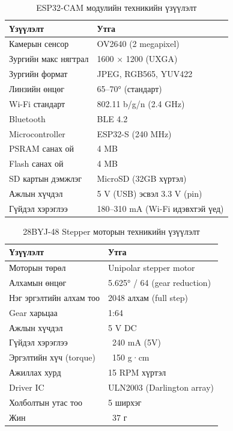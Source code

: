 \documentclass[12pt,a4paper]{report}
\begin{document}
\begin{table}[H]
\centering
\scriptsize
\caption{ESP32-CAM модулийн техникийн үзүүлэлт}
\label{tab:esp32cam-spec}
\begin{tabularx}{\textwidth}{|X|X|}
\hline
\textbf{Үзүүлэлт} & \textbf{Утга} \\ \hline
Камерын сенсор          & OV2640 (2 megapixel) \\ \hline
Зургийн макс нягтрал    & 1600 × 1200 (UXGA) \\ \hline
Зургийн формат          & JPEG, RGB565, YUV422 \\ \hline
Линзийн өнцөг           & 65--70° (стандарт) \\ \hline
Wi-Fi стандарт          & 802.11 b/g/n (2.4 GHz) \\ \hline
Bluetooth               & BLE 4.2 \\ \hline
Microcontroller         & ESP32-S (240 MHz) \\ \hline
PSRAM санах ой          & 4 MB \\ \hline
Flash санах ой          & 4 MB \\ \hline
SD картын дэмжлэг       & MicroSD (32GB хүртэл) \\ \hline
Ажлын хүчдэл            & 5 V (USB) эсвэл 3.3 V (pin) \\ \hline
Гүйдэл хэрэглээ         & 180--310 mA (Wi-Fi идэвхтэй үед) \\ \hline
\end{tabularx}
\end{table}

\begin{table}[H]
\centering
\scriptsize
\caption{28BYJ-48 Stepper моторын техникийн үзүүлэлт}
\label{tab:stepper-spec}
\begin{tabularx}{\textwidth}{|X|X|}
\hline
\textbf{Үзүүлэлт} & \textbf{Утга} \\ \hline
Моторын төрөл           & Unipolar stepper motor \\ \hline
Алхамын өнцөг           & 5.625° / 64 (gear reduction) \\ \hline
Нэг эргэлтийн алхам тоо & 2048 алхам (full step) \\ \hline
Gear харьцаа            & 1:64 \\ \hline
Ажлын хүчдэл            & 5 V DC \\ \hline
Гүйдэл хэрэглээ         & ~240 mA (5V) \\ \hline
Эргэлтийн хүч (torque)  & ~150 g·cm \\ \hline
Ажиллах хурд            & 15 RPM хүртэл \\ \hline
Driver IC               & ULN2003 (Darlington array) \\ \hline
Холболтын утас тоо      & 5 ширхэг \\ \hline
Жин                     & ~37 г \\ \hline
\end{tabularx}
\end{table}
\end{document}
